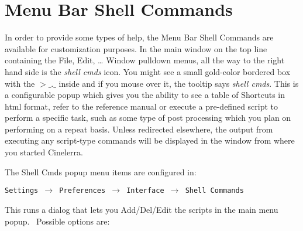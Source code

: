 \section{Menu Bar Shell Commands}%
\label{menu_bar_shell_commands}

In order to provide some types of help, the Menu Bar Shell Commands are available for customization purposes. In the
main window on the top line containing the File, Edit, {\dots} Window pulldown menus, all the way to the right hand
side is the \textit{shell cmds} icon. You might see a small gold-color bordered box with the $>\_.\_$ inside
and if you mouse over it, the tooltip says \textit{shell cmds}. This is a configurable popup which gives you the ability to
see a table of Shortcuts in html format, refer to the reference manual or execute a pre-defined script to perform a
specific task, such as some type of post processing which you plan on performing on a repeat basis. Unless redirected
elsewhere, the output from executing any script-type commands will be displayed in the window from where you started
Cinelerra.

The Shell Cmds popup menu items are configured in:

\texttt{Settings $\rightarrow$ Preferences $\rightarrow$ Interface $\rightarrow$ Shell Commands}

This runs a dialog that lets you Add/Del/Edit the scripts in the main menu popup. \ Possible options are:\newline


